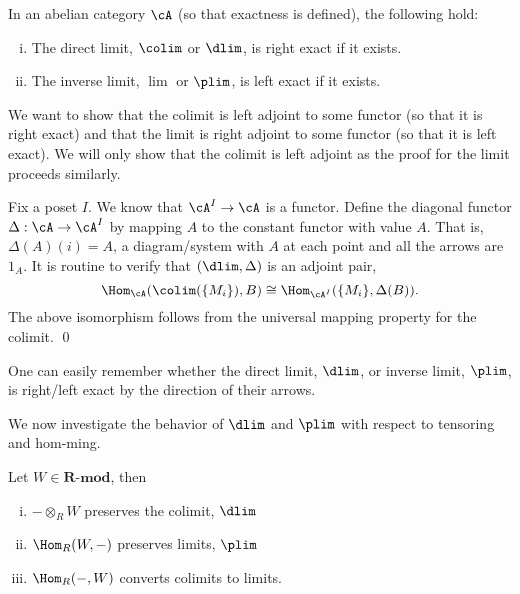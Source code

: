\begin{prop}
In an abelian category $\cA$ (so that exactness is defined), the following hold:
	\begin{enumerate}[(i)]
	\item	 The direct limit, $\colim$ or $\dlim$, is right exact if it exists.
	\item The inverse limit, $\lim$ or $\plim$, is left exact if it exists.
	\end{enumerate}
\end{prop}

\pf We want to show that the colimit is left adjoint to some functor (so that it is right exact) and that the limit is right adjoint to some functor (so that it is left exact). We will only show that the colimit is left adjoint as the proof for the limit proceeds similarly. 

Fix a poset $I$. We know that $\cA^I \rightarrow \cA$ is a functor. Define the diagonal functor $\Delta: \cA \rightarrow \cA^I$ by mapping $A$ to the constant functor with value $A$. That is, $\Delta(A)(i)=A$, a diagram/system with $A$ at each point and all the arrows are $1_A$. It is routine to verify that $(\dlim, \Delta)$ is an adjoint pair,
	\[
	\Hom_{\cA}(\colim(\{M_i\}),B) \cong \Hom_{\cA^I}(\{M_i\},\Delta(B)).
	\]
The above isomorphism follows from the universal mapping property for the colimit. \qed \\


\begin{rem}
One can easily remember whether the direct limit, $\dlim$, or inverse limit, $\plim$, is right/left exact by the direction of their arrows.
\end{rem}


We now investigate the behavior of $\dlim$ and $\plim$ with respect to tensoring and hom-ming. 


\begin{prop}
Let $W \in \textbf{R-mod}$, then
	\begin{enumerate}[(i)]
	\item $- \otimes_R W$ preserves the colimit, $\dlim$
	\item $\Hom_R(W,-)$ preserves limits, $\plim$
	\item $\Hom_R(-,W)$ converts colimits to limits. 
	\end{enumerate}
\end{prop}

